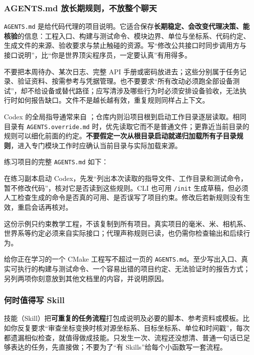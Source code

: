 \subsubsection{AGENTS.md 放长期规则，不放整个聊天}
\texttt{AGENTS.md} 是给代码代理的项目说明。它适合保存\textbf{长期稳定、会改变代理决策、能核验}的信息：工程入口、构建与测试命令、模块边界、单位与坐标系、代码约定、生成文件的来源、验收要求与禁止触碰的资源。写“修改公共接口时同步调用方与接口说明”，比“你是世界顶尖程序员，一定要认真”有用得多。

不要把本周待办、某次日志、完整 API 手册或密码放进去；这些分别属于任务记录、验证资料、按需参考与凭据管理。也不要要求“所有改动必须跑全部设备测试”，却不给设备或替代路径；应写清涉及哪些行为时必须安排设备验收，无法执行时如何报告缺口。文件不是越长越有效，重复规则同样占上下文。

Codex 的全局指导通常来自 ；仓库内则沿项目根到启动工作目录逐层读取。相同目录有 \texttt{AGENTS.override.md} 时，优先读取它而不是普通文件；更靠近当前目录的规则可以细化前面的约定。\textbf{不要假定一次从根目录启动就递归加载所有子目录规则}，进入专门模块工作时应确认当前目录与实际加载来源。

\begin{example}[给距离换算工程写一份够用的规则]
练习项目的完整 \texttt{AGENTS.md} 如下：

在练习副本启动 Codex，先发“列出本次读取的指导文件、工作目录和测试命令，暂不修改代码”，核对它是否读到这些规则。CLI 也可用 \texttt{/init} 生成草稿，但必须人工检查生成的命令是否真的可用、是否误写了项目约束。修改后若新规则没有生效，重启会话再核对。
\end{example}

这份示例只约束教学工程，不该复制到所有项目。真实项目的毫米、米、相机系、世界系等约定必须来自实际接口；代理声称规则已读，也仍需你检查输出和后续行为。

\begin{exercise}\label{ex:ai-agents}
给你正在学习的一个 CMake 工程写不超过一页的 \texttt{AGENTS.md}。至少写出入口、真实可执行的构建与测试命令、一个容易出错的项目约定、无法验证时的报告方式；另列两项你刻意放到其他文档里的内容，并说明原因。
\end{exercise}

\subsubsection{何时值得写 Skill}
技能（Skill）把\textbf{可重复的任务流程}打包成说明及必要的脚本、参考资料或模板。比如你反复要求“审查坐标变换时核对源坐标系、目标坐标系、单位和时间戳”，每次都遗漏相似检查，就值得做成技能。只发生一次、流程还没想清、普通一句话已足够表达的任务，先直接做；不要为了“有 Skills”给每个小函数写一套流程。

